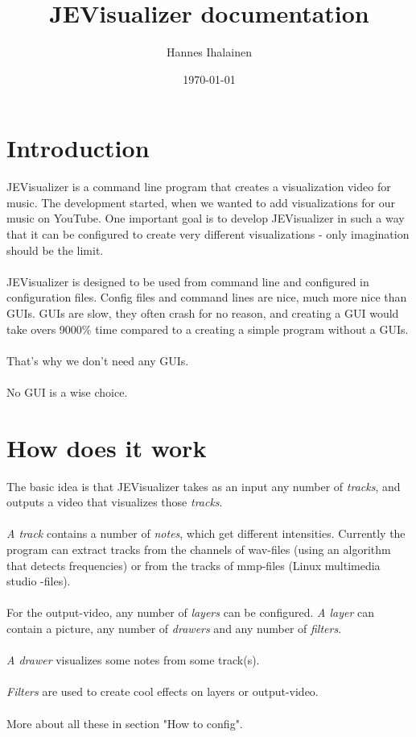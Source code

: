 \documentclass{article}
\title{JEVisualizer documentation}
\author{Hannes Ihalainen}
\date{\today}
\begin{document}
  \maketitle
  \newpage
  \tableofcontents
  \newpage
    
  \section{Introduction}
    JEVisualizer is a command line program that creates a visualization video for music. The development started, when we wanted to add visualizations for our music on YouTube. One important goal is to develop JEVisualizer in such a way that it can be configured to
    create very different visualizations - only imagination should be the limit. \\ \\
    JEVisualizer is designed to be used from command line and configured in configuration files. Config files and command lines are nice, 
    much more nice than GUIs. GUIs are slow, they often crash for no reason, and creating a GUI would take overs 9000\% time compared
    to a creating a simple program without a GUIs. \\ \\
    That's why we don't need any GUIs. \\ \\
    No GUI is a wise choice.
  \section{How does it work}
    The basic idea is that JEVisualizer takes as an input any number of \textit{tracks}, and outputs a video that visualizes those \textit{tracks}. \\ \\
    \textit{A track} contains a number of \textit{notes}, which get different intensities. Currently the program can extract tracks from the channels of wav-files (using an algorithm that detects frequencies) or from the tracks of mmp-files (Linux multimedia studio -files). \\ \\
    For the output-video, any number of \textit{layers} can be configured. \textit{A layer} can contain a picture, any number of 
    \textit{drawers} and any number of \textit{filters}. \\ \\
    \textit{A drawer} visualizes some notes from some track(s). \\ \\
    \textit{Filters} are used to create cool effects on layers or output-video. \\ \\
    More about all these in section "How to config".
\end{document}
